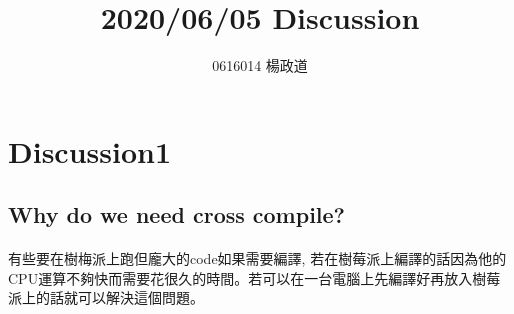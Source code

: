 \title{2020/06/05 Discussion}
\author{0616014 楊政道}
\maketitle
\thispagestyle{fancy}
\section{Discussion1}
\subsection{Why do we need cross compile?}
\paragraph{}
有些要在樹梅派上跑但龐大的code如果需要編譯, 若在樹莓派上編譯的話因為他的CPU運算不夠快而需要花很久的時間。若可以在一台電腦上先編譯好再放入樹莓派上的話就可以解決這個問題。
